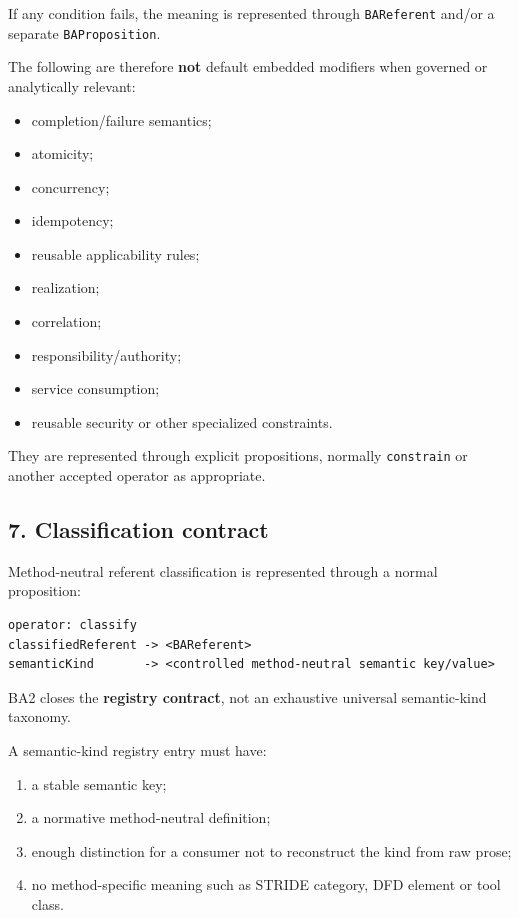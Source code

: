 \documentclass[11pt,a4paper]{article}
\providecommand{\tightlist}{\setlength{\itemsep}{0pt}\setlength{\parskip}{0pt}}
\begin{document}
If any condition fails, the meaning is represented through \texttt{BAReferent} and/or a separate \texttt{BAProposition}.

The following are therefore \textbf{not} default embedded modifiers when governed or analytically relevant:

\begin{itemize}
\tightlist
\item
  completion/failure semantics;
\item
  atomicity;
\item
  concurrency;
\item
  idempotency;
\item
  reusable applicability rules;
\item
  realization;
\item
  correlation;
\item
  responsibility/authority;
\item
  service consumption;
\item
  reusable security or other specialized constraints.
\end{itemize}

They are represented through explicit propositions, normally \texttt{constrain} or another accepted operator as appropriate.

\subsection{7. Classification contract}\label{classification-contract}

Method-neutral referent classification is represented through a normal proposition:

\begin{verbatim}
operator: classify
classifiedReferent -> <BAReferent>
semanticKind       -> <controlled method-neutral semantic key/value>
\end{verbatim}

BA2 closes the \textbf{registry contract}, not an exhaustive universal semantic-kind taxonomy.

A semantic-kind registry entry must have:

\begin{enumerate}
\def\labelenumi{\arabic{enumi}.}
\tightlist
\item
  a stable semantic key;
\item
  a normative method-neutral definition;
\item
  enough distinction for a consumer not to reconstruct the kind from raw prose;
\item
  no method-specific meaning such as STRIDE category, DFD element or tool class.
\end{enumerate}
\end{document}
